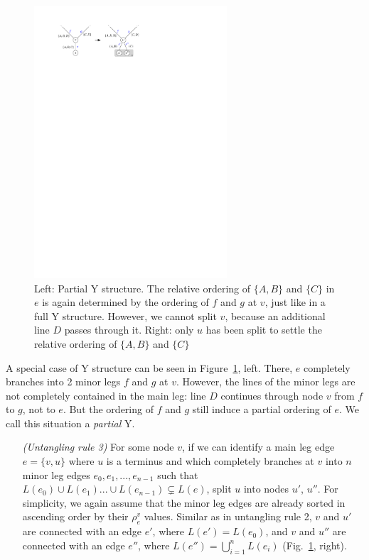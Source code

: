 \documentclass[format=acmsmall, review=false, screen=true]{acmart}
\begin{document}
\begin{figure}
  \centering
  \includegraphics[width=0.64\textwidth]{untangling/y_partial.pdf}
  \caption{Left: Partial Y structure. The relative ordering of $\{A, B\}$ and $\{C\}$ in $e$ is again determined by the ordering of $f$ and $g$ at $v$, just like in a full Y structure. However, we cannot split $v$, because an additional line $D$ passes through it. Right: only $u$ has been split to settle the relative ordering of $\{A, B\}$ and $\{C\}$}  
  \label{FIG:untangle_y_partial}
\end{figure}

A special case of Y structure can be seen in Figure~\ref{FIG:untangle_y_partial}, left.
There, $e$ completely branches into 2 minor legs $f$ and $g$ at $v$.
However, the lines of the minor legs are not completely contained in the main leg: line $D$ continues through node $v$ from $f$ to $g$, not to $e$.
But the ordering of $f$ and $g$ still induce a partial ordering of $e$.
We call this situation a \emph{partial} Y.

\begin{enumerate}[parsep=0.5mm, wide, labelwidth=0mm, itemindent=2.3mm]
  \setlength\itemsep{1pt}
  \item[\emph{(Untangling rule 3)}] For some node $v$, if we can identify a main leg edge $e = \{v, u\}$ where $u$ is a terminus and which completely branches at $v$ into $n$ minor leg edges $e_{0}, e_{1}, ..., e_{n-1}$ such that $L(e_{0}) \cup L(e_{1}) ... \cup L(e_{n-1}) \subsetneq L(e)$, split $u$ into nodes $u'$, $u''$.
  For simplicity, we again assume that the minor leg edges are already sorted in ascending order by their $\rho^v_e$ values. 
  Similar as in untangling rule 2, $v$ and $u'$ are connected with an edge $e'$, where $L(e') = L(e_{0})$, and $v$ and $u''$ are connected with an edge $e''$, where $L(e'') = \bigcup^{n}_{i = 1} L(e_{i})$  (Fig.~\ref{FIG:untangle_y_partial}, right).
\end{enumerate}
\end{document}
